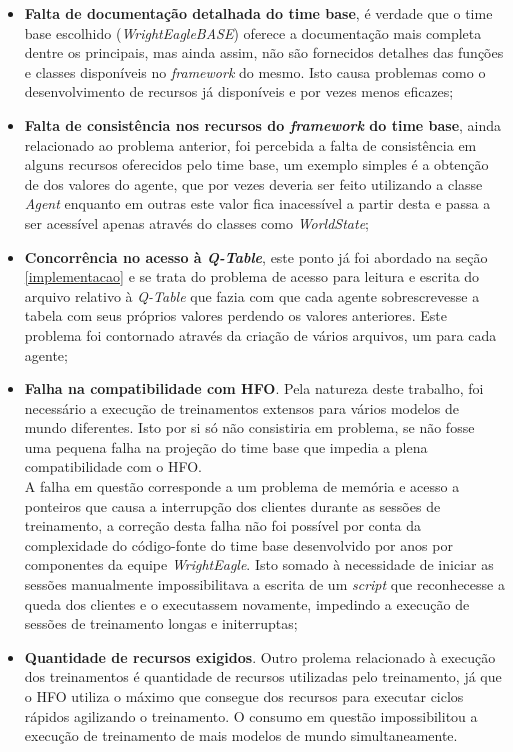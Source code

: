 \begin{itemize}
    \item \textbf{Falta de documentação detalhada do time base}, é verdade que o
    time base escolhido (\textit{WrightEagleBASE}) oferece a
    documentação mais completa dentre os principais, mas ainda assim, não são
    fornecidos detalhes das funções e classes disponíveis no \textit{framework}
    do mesmo. Isto causa problemas como o desenvolvimento de recursos já
    disponíveis e por vezes menos eficazes;
    \item \textbf{Falta de consistência nos recursos do \textit{framework} do
    time base}, ainda relacionado ao problema anterior, foi percebida a falta de
    consistência em alguns recursos oferecidos pelo time base, um exemplo
    simples é a obtenção de dos valores do agente, que por vezes deveria ser
    feito utilizando a classe \textit{Agent} enquanto em outras este valor fica
    inacessível a partir desta e passa a ser acessível apenas através do classes
    como \textit{WorldState};
    \item \textbf{Concorrência no acesso à \textit{Q-Table}}, este ponto já foi
    abordado na seção \ref{implementacao} e se trata do problema de acesso para
    leitura e escrita do arquivo relativo à \textit{Q-Table} que fazia com que
    cada agente sobrescrevesse a tabela com seus próprios valores perdendo os
    valores anteriores. Este problema foi contornado através da criação de
    vários arquivos, um para cada agente;
    \item \textbf{Falha na compatibilidade com HFO}. Pela natureza deste trabalho, foi necessário a execução de treinamentos extensos para
    vários modelos de mundo diferentes. Isto por si só não consistiria em problema, se não
    fosse uma pequena falha na projeção do time base que impedia a plena
    compatibilidade com o HFO. \\
    A falha em questão corresponde a um problema de memória e acesso a ponteiros que
    causa a interrupção dos clientes durante as sessões de treinamento, a correção
    desta falha não foi possível por conta da complexidade do código-fonte do time
    base desenvolvido por anos por componentes da equipe \textit{WrightEagle}. Isto
    somado à necessidade de iniciar as sessões manualmente impossibilitava a
    escrita de um \textit{script} que reconhecesse a queda dos clientes e o
    executassem novamente, impedindo a execução de sessões de treinamento longas e
    initerruptas;
    \item \textbf{Quantidade de recursos exigidos}. Outro prolema relacionado à execução dos treinamentos é quantidade de recursos
    utilizadas pelo treinamento, já que o HFO utiliza o máximo que consegue dos
    recursos para executar ciclos rápidos agilizando o treinamento. O consumo em
    questão impossibilitou a execução de treinamento de mais modelos de mundo
    simultaneamente.
\end{itemize}

